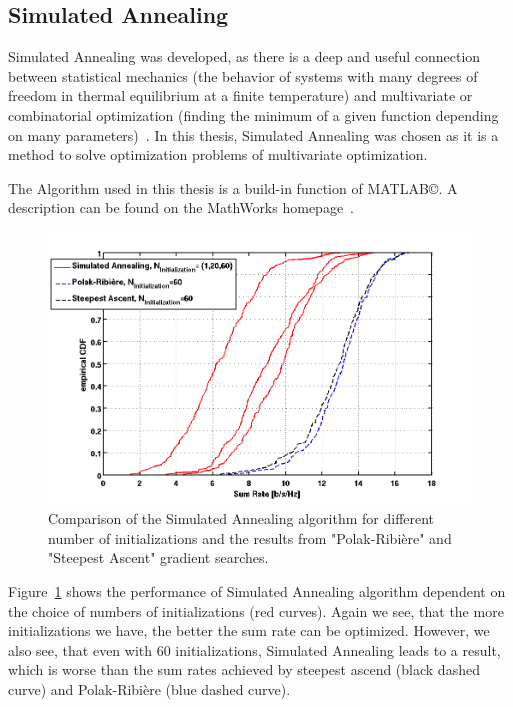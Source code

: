 \subsection{Simulated Annealing}
\label{sec:sim_annealing}

Simulated Annealing was developed, as there is a deep and useful connection between statistical mechanics (the behavior of systems with many degrees of freedom in thermal equilibrium at a finite temperature) and multivariate or combinatorial optimization (finding the minimum of a given function depending on many parameters)~\cite{Kirkpatrick83}.
In this thesis, Simulated Annealing was chosen as it is a method to solve optimization problems of multivariate optimization.

The Algorithm used in this thesis is a build-in function of MATLAB\copyright.
A description can be found on the MathWorks homepage~\cite{matlab:simulann}.

\begin{figure}[h]
\centering
  \includegraphics[width=0.9\linewidth]{images/Simannealcomparison.png}
\caption{Comparison of the Simulated Annealing algorithm for different number of initializations and the results from "Polak-Ribi\`{e}re" and "Steepest Ascent" gradient searches.}
\label{fig:heur_sa}
\end{figure}

Figure~\ref{fig:heur_sa} shows the performance of Simulated Annealing algorithm dependent on the choice of numbers of initializations (red curves).
Again we see, that the more initializations we have, the better the sum rate can be optimized.
However, we also see, that even with 60 initializations, Simulated Annealing leads to a result, which is worse than the sum rates achieved by steepest ascend (black dashed curve) and Polak-Ribi\`{e}re (blue dashed curve).


